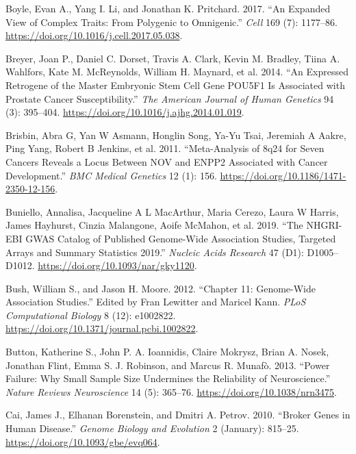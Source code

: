 \documentclass[
  11pt,
]{env/yjiao}
\newlength{\cslhangindent}
\newenvironment{cslreferences}%
  {\setlength{\parindent}{0pt}%
  \everypar{\setlength{\hangindent}{\cslhangindent}}\ignorespaces}%
  {\par}
\begin{document}
\begin{cslreferences}
\leavevmode\hypertarget{ref-boyle_expanded_2017}{}%
Boyle, Evan A., Yang I. Li, and Jonathan K. Pritchard. 2017. ``An Expanded View of Complex Traits: From Polygenic to Omnigenic.'' \emph{Cell} 169 (7): 1177--86. \url{https://doi.org/10.1016/j.cell.2017.05.038}.

\leavevmode\hypertarget{ref-breyer_expressed_2014}{}%
Breyer, Joan P., Daniel C. Dorset, Travis A. Clark, Kevin M. Bradley, Tiina A. Wahlfors, Kate M. McReynolds, William H. Maynard, et al. 2014. ``An Expressed Retrogene of the Master Embryonic Stem Cell Gene POU5F1 Is Associated with Prostate Cancer Susceptibility.'' \emph{The American Journal of Human Genetics} 94 (3): 395--404. \url{https://doi.org/10.1016/j.ajhg.2014.01.019}.

\leavevmode\hypertarget{ref-brisbin_meta-analysis_2011}{}%
Brisbin, Abra G, Yan W Asmann, Honglin Song, Ya-Yu Tsai, Jeremiah A Aakre, Ping Yang, Robert B Jenkins, et al. 2011. ``Meta-Analysis of 8q24 for Seven Cancers Reveals a Locus Between NOV and ENPP2 Associated with Cancer Development.'' \emph{BMC Medical Genetics} 12 (1): 156. \url{https://doi.org/10.1186/1471-2350-12-156}.

\leavevmode\hypertarget{ref-buniello_nhgri-ebi_2019}{}%
Buniello, Annalisa, Jacqueline A L MacArthur, Maria Cerezo, Laura W Harris, James Hayhurst, Cinzia Malangone, Aoife McMahon, et al. 2019. ``The NHGRI-EBI GWAS Catalog of Published Genome-Wide Association Studies, Targeted Arrays and Summary Statistics 2019.'' \emph{Nucleic Acids Research} 47 (D1): D1005--D1012. \url{https://doi.org/10.1093/nar/gky1120}.

\leavevmode\hypertarget{ref-bush_chapter_2012}{}%
Bush, William S., and Jason H. Moore. 2012. ``Chapter 11: Genome-Wide Association Studies.'' Edited by Fran Lewitter and Maricel Kann. \emph{PLoS Computational Biology} 8 (12): e1002822. \url{https://doi.org/10.1371/journal.pcbi.1002822}.

\leavevmode\hypertarget{ref-button_power_2013}{}%
Button, Katherine S., John P. A. Ioannidis, Claire Mokrysz, Brian A. Nosek, Jonathan Flint, Emma S. J. Robinson, and Marcus R. Munafò. 2013. ``Power Failure: Why Small Sample Size Undermines the Reliability of Neuroscience.'' \emph{Nature Reviews Neuroscience} 14 (5): 365--76. \url{https://doi.org/10.1038/nrn3475}.

\leavevmode\hypertarget{ref-cai_broker_2010}{}%
Cai, James J., Elhanan Borenstein, and Dmitri A. Petrov. 2010. ``Broker Genes in Human Disease.'' \emph{Genome Biology and Evolution} 2 (January): 815--25. \url{https://doi.org/10.1093/gbe/evq064}.


\end{cslreferences}
\end{document}
